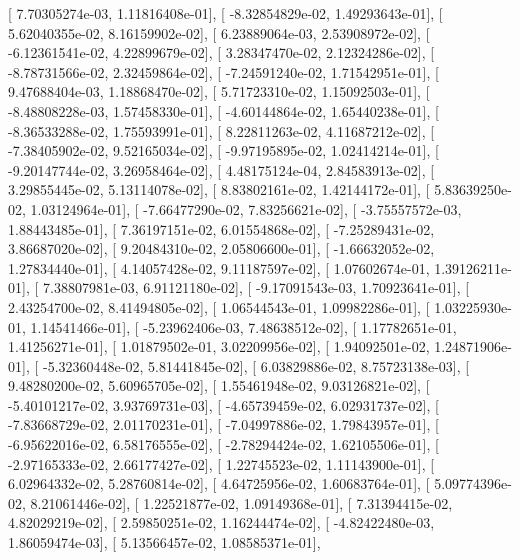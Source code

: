 \documentclass{article}
\begin{document}
       [  7.70305274e-03,   1.11816408e-01],
       [ -8.32854829e-02,   1.49293643e-01],
       [  5.62040355e-02,   8.16159902e-02],
       [  6.23889064e-03,   2.53908972e-02],
       [ -6.12361541e-02,   4.22899679e-02],
       [  3.28347470e-02,   2.12324286e-02],
       [ -8.78731566e-02,   2.32459864e-02],
       [ -7.24591240e-02,   1.71542951e-01],
       [  9.47688404e-03,   1.18868470e-02],
       [  5.71723310e-02,   1.15092503e-01],
       [ -8.48808228e-03,   1.57458330e-01],
       [ -4.60144864e-02,   1.65440238e-01],
       [ -8.36533288e-02,   1.75593991e-01],
       [  8.22811263e-02,   4.11687212e-02],
       [ -7.38405902e-02,   9.52165034e-02],
       [ -9.97195895e-02,   1.02414214e-01],
       [ -9.20147744e-02,   3.26958464e-02],
       [  4.48175124e-04,   2.84583913e-02],
       [  3.29855445e-02,   5.13114078e-02],
       [  8.83802161e-02,   1.42144172e-01],
       [  5.83639250e-02,   1.03124964e-01],
       [ -7.66477290e-02,   7.83256621e-02],
       [ -3.75557572e-03,   1.88443485e-01],
       [  7.36197151e-02,   6.01554868e-02],
       [ -7.25289431e-02,   3.86687020e-02],
       [  9.20484310e-02,   2.05806600e-01],
       [ -1.66632052e-02,   1.27834440e-01],
       [  4.14057428e-02,   9.11187597e-02],
       [  1.07602674e-01,   1.39126211e-01],
       [  7.38807981e-03,   6.91121180e-02],
       [ -9.17091543e-03,   1.70923641e-01],
       [  2.43254700e-02,   8.41494805e-02],
       [  1.06544543e-01,   1.09982286e-01],
       [  1.03225930e-01,   1.14541466e-01],
       [ -5.23962406e-03,   7.48638512e-02],
       [  1.17782651e-01,   1.41256271e-01],
       [  1.01879502e-01,   3.02209956e-02],
       [  1.94092501e-02,   1.24871906e-01],
       [ -5.32360448e-02,   5.81441845e-02],
       [  6.03829886e-02,   8.75723138e-03],
       [  9.48280200e-02,   5.60965705e-02],
       [  1.55461948e-02,   9.03126821e-02],
       [ -5.40101217e-02,   3.93769731e-03],
       [ -4.65739459e-02,   6.02931737e-02],
       [ -7.83668729e-02,   2.01170231e-01],
       [ -7.04997886e-02,   1.79843957e-01],
       [ -6.95622016e-02,   6.58176555e-02],
       [ -2.78294424e-02,   1.62105506e-01],
       [ -2.97165333e-02,   2.66177427e-02],
       [  1.22745523e-02,   1.11143900e-01],
       [  6.02964332e-02,   5.28760814e-02],
       [  4.64725956e-02,   1.60683764e-01],
       [  5.09774396e-02,   8.21061446e-02],
       [  1.22521877e-02,   1.09149368e-01],
       [  7.31394415e-02,   4.82029219e-02],
       [  2.59850251e-02,   1.16244474e-02],
       [ -4.82422480e-03,   1.86059474e-03],
       [  5.13566457e-02,   1.08585371e-01],
\end{document}
